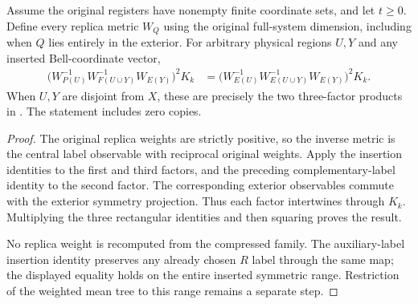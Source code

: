 \begin{theorem}
    \label{thm:bell_actual_pinned_metric_factor}
    \leanok
    Assume the original registers have nonempty finite coordinate sets,
    and let $t\ge0$. Define every replica metric $W_Q$ using the original
    full-system dimension, including when $Q$ lies entirely in the
    exterior. For arbitrary physical regions $U,Y$ and any inserted
    Bell-coordinate vector,
    \begin{align*}
        \bigl(W_{P(U)}^{-1}W_{F(U\cup Y)}^{-1}W_{E(Y)}\bigr)^2K_k
        &=\bigl(W_{E(U)}^{-1}W_{E(U\cup Y)}^{-1}W_{E(Y)}\bigr)^2K_k.
    \end{align*}
    When $U,Y$ are disjoint from $X$, these are precisely the two
    three-factor products in
    \cite[\texttt{07-comparators.tex}, lines 299--308,
    \texttt{comparator:pinned-metric}]{OpenAI2026AreaLaw}.
    The statement includes zero copies.
\end{theorem}
\begin{proof}\leanok
    The original replica weights are strictly positive, so the inverse
    metric is the central label observable with reciprocal original
    weights. Apply the insertion identities to the first and third
    factors, and the preceding complementary-label identity to the
    second factor. The corresponding exterior observables commute with
    the exterior symmetry projection. Thus each factor intertwines
    through $K_k$. Multiplying the three rectangular identities and then
    squaring proves the result.

    No replica weight is recomputed from the compressed family. The
    auxiliary-label insertion identity preserves any already chosen
    $R$ label through the same map; the displayed equality holds on the
    entire inserted symmetric range. Restriction of the weighted mean
    tree to this range remains a separate step.
\end{proof}

